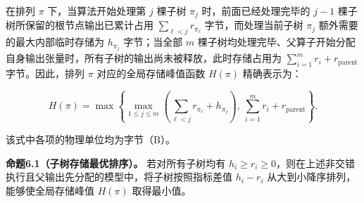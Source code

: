 \documentclass[anonymous,notoc]{gmcm2026}
\begin{document}
在排列 \(\pi\) 下，当算法开始处理第 \(j\) 棵子树 \(\pi_j\) 时，前面已经处理完毕的 \(j - 1\) 棵子树所保留的根节点输出已累计占用 \(\sum_{\ell < j} r_{\pi_\ell}\) 字节，而处理当前子树 \(\pi_j\) 额外需要的最大内部临时存储为 \(h_{\pi_j}\) 字节；当全部 \(m\) 棵子树均处理完毕、父算子开始分配自身输出张量时，所有子树的输出尚未被释放，此时存储占用为 \(\sum_{i=1}^m r_i + r_{\mathrm{parent}}\) 字节。因此，排列 \(\pi\) 对应的全局存储峰值函数 \(H(\pi)\) 精确表示为：

\begin{equation}
H(\pi) = \max \left\{ \max_{1 \le j \le m} \left( \sum_{\ell < j} r_{\pi_\ell} + h_{\pi_j} \right), \ \sum_{i=1}^m r_i + r_{\mathrm{parent}} \right\}.
\end{equation}

该式中各项的物理单位均为字节（B）。

\textbf{命题6.1（子树存储最优排序）。} 若对所有子树均有 \(h_i \ge r_i \ge 0\)，则在上述非交错执行且父输出先分配的模型中，将子树按照指标差值 \(h_i - r_i\) 从大到小降序排列，能够使全局存储峰值 \(H(\pi)\) 取得最小值。
\end{document}

